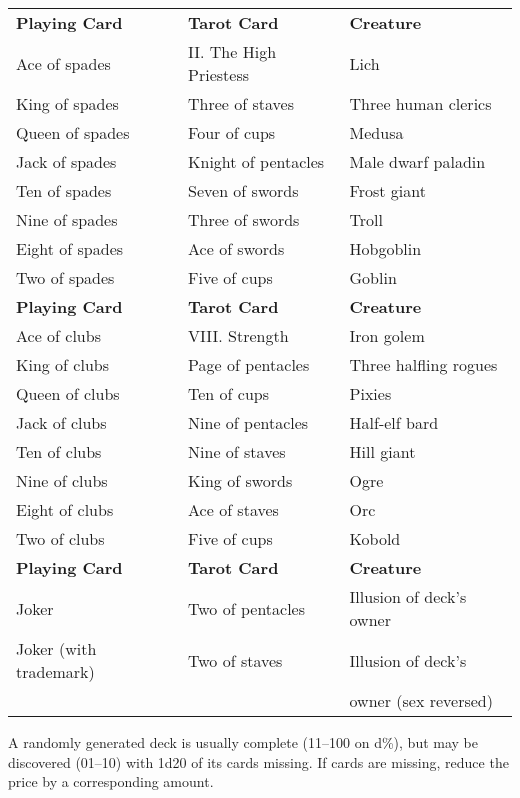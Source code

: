\begin{tabularx}{\linewidth}{lll}
\textbf{Playing Card}  & \textbf{Tarot Card}    & \textbf{Creature}                       \\
Ace of spades          & II. The High Priestess & Lich                                    \\
King of spades         & Three of staves        & Three human clerics                     \\
Queen of spades        & Four of cups           & Medusa                                  \\
Jack of spades         & Knight of pentacles    & Male dwarf paladin                      \\
Ten of spades          & Seven of swords        & Frost giant                             \\
Nine of spades         & Three of swords        & Troll                                   \\
Eight of spades        & Ace of swords          & Hobgoblin                               \\
Two of spades          & Five of cups           & Goblin                                  \\
\textbf{Playing Card}  & \textbf{Tarot Card}    & \textbf{Creature}                       \\
Ace of clubs           & VIII. Strength         & Iron golem                              \\
King of clubs          & Page of pentacles      & Three halfling rogues                   \\
Queen of clubs         & Ten of cups            & Pixies                                  \\
Jack of clubs          & Nine of pentacles      & Half-elf bard                           \\
Ten of clubs           & Nine of staves         & Hill giant                              \\
Nine of clubs          & King of swords         & Ogre                                    \\
Eight of clubs         & Ace of staves          & Orc                                     \\
Two of clubs           & Five of cups           & Kobold                                  \\
\textbf{Playing Card}  & \textbf{Tarot Card}    & \textbf{Creature}                       \\
Joker                  & Two of pentacles       & Illusion of deck's owner                \\
Joker (with trademark) & Two of staves          & Illusion of deck's \\
                       &                        & owner (sex reversed)
\end{tabularx}				
A randomly generated deck is usually complete (11--100 on d\%), but may be discovered (01--10) with 1d20 of its cards missing. If cards are missing, reduce the price by a corresponding amount. 
				
